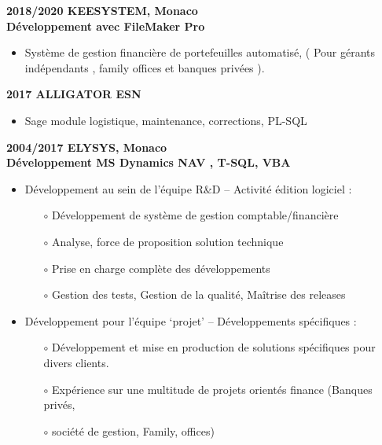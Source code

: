\documentclass[10pt,a4paper]{article}
\newcommand{\myvspace}{\vspace{0.3cm}}
\begin{document}
\begin{minipage}[t]{0.65\textwidth}
    \textbf{2018/2020 KEESYSTEM, Monaco \\
    Développement avec FileMaker Pro} 
        \begin{itemize}[nosep, leftmargin=*, itemsep=0pt, parsep=0pt]
            \item Système de gestion financière de portefeuilles automatisé, ( Pour gérants
        indépendants , family offices et banques privées ). 
        \end{itemize}
    \myvspace
    \textbf{2017 ALLIGATOR ESN} 
        \begin{itemize}[nosep, leftmargin=*, itemsep=0pt, parsep=0pt]
            \item Sage module logistique, maintenance, corrections, PL-SQL 
        \end{itemize}
    \myvspace
    \textbf{2004/2017 ELYSYS, Monaco \\
    Développement MS Dynamics NAV , T-SQL, VBA} 
    \begin{itemize}[nosep, leftmargin=*, itemsep=0pt, parsep=0pt]
        \item Développement au sein de l’équipe R\&D – Activité édition logiciel :
            \begin{itemize}[nosep, leftmargin=*, itemsep=0pt, parsep=0pt]
                \item[$\circ$] Développement de système de gestion comptable/financière
                \item[$\circ$] Analyse, force de proposition solution technique
                \item[$\circ$] Prise en charge complète des développements
                \item[$\circ$] Gestion des tests, Gestion de la qualité, Maîtrise des releases
            \end{itemize}
        \item Développement pour l’équipe ‘projet’ – Développements spécifiques :
            \begin{itemize}[nosep, leftmargin=*, itemsep=0pt, parsep=0pt]
                \item[$\circ$] Développement et mise en production de solutions spécifiques pour divers
                clients.
                \item[$\circ$] Expérience sur une multitude de projets orientés finance (Banques privés,
                \item[$\circ$] société de gestion, Family, offices)
            \end{itemize}
    \end{itemize}

\end{minipage}
\end{document}
